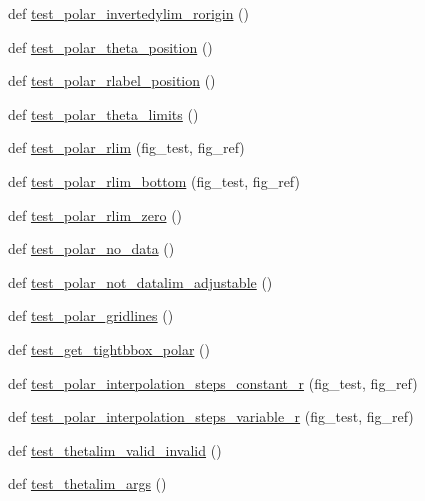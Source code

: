 \begin{DoxyCompactItemize}
\item 
def \hyperlink{namespacematplotlib_1_1tests_1_1test__polar_a6cbf8e8adf3797627ff928d9440d0644}{test\+\_\+polar\+\_\+invertedylim\+\_\+rorigin} ()
\item 
def \hyperlink{namespacematplotlib_1_1tests_1_1test__polar_a52f1852d6399aac6052e279607c6e8bb}{test\+\_\+polar\+\_\+theta\+\_\+position} ()
\item 
def \hyperlink{namespacematplotlib_1_1tests_1_1test__polar_abd2d087a515f5ba6bd24f07b0c44f301}{test\+\_\+polar\+\_\+rlabel\+\_\+position} ()
\item 
def \hyperlink{namespacematplotlib_1_1tests_1_1test__polar_a1c23005b1067f7884cf4c2b1edc33e20}{test\+\_\+polar\+\_\+theta\+\_\+limits} ()
\item 
def \hyperlink{namespacematplotlib_1_1tests_1_1test__polar_af0d75a4a9c2207d11e8471912d7222c5}{test\+\_\+polar\+\_\+rlim} (fig\+\_\+test, fig\+\_\+ref)
\item 
def \hyperlink{namespacematplotlib_1_1tests_1_1test__polar_ae182dcc4d5eece0949cbb7fa9640e917}{test\+\_\+polar\+\_\+rlim\+\_\+bottom} (fig\+\_\+test, fig\+\_\+ref)
\item 
def \hyperlink{namespacematplotlib_1_1tests_1_1test__polar_ac7829d19d55579fa395bdae20f934b3d}{test\+\_\+polar\+\_\+rlim\+\_\+zero} ()
\item 
def \hyperlink{namespacematplotlib_1_1tests_1_1test__polar_afd45758fc651257c712e74f554897a71}{test\+\_\+polar\+\_\+no\+\_\+data} ()
\item 
def \hyperlink{namespacematplotlib_1_1tests_1_1test__polar_ae35e3450b63d2544d9e90d0d55457aa7}{test\+\_\+polar\+\_\+not\+\_\+datalim\+\_\+adjustable} ()
\item 
def \hyperlink{namespacematplotlib_1_1tests_1_1test__polar_a86662dfb57c609ebe8cfc22c6376dd86}{test\+\_\+polar\+\_\+gridlines} ()
\item 
def \hyperlink{namespacematplotlib_1_1tests_1_1test__polar_adb4510cbf18911d8efc66855de9dd1ae}{test\+\_\+get\+\_\+tightbbox\+\_\+polar} ()
\item 
def \hyperlink{namespacematplotlib_1_1tests_1_1test__polar_afd4efa58fe1c2f975fdf2a22e0a98056}{test\+\_\+polar\+\_\+interpolation\+\_\+steps\+\_\+constant\+\_\+r} (fig\+\_\+test, fig\+\_\+ref)
\item 
def \hyperlink{namespacematplotlib_1_1tests_1_1test__polar_aaaed86b57db9f619e671f6fa20712c10}{test\+\_\+polar\+\_\+interpolation\+\_\+steps\+\_\+variable\+\_\+r} (fig\+\_\+test, fig\+\_\+ref)
\item 
def \hyperlink{namespacematplotlib_1_1tests_1_1test__polar_a752758f1b25f4fd0eb5e1af671ba187d}{test\+\_\+thetalim\+\_\+valid\+\_\+invalid} ()
\item 
def \hyperlink{namespacematplotlib_1_1tests_1_1test__polar_a53c925318ef9e4745710af2cb35ef1ae}{test\+\_\+thetalim\+\_\+args} ()
\end{DoxyCompactItemize}
